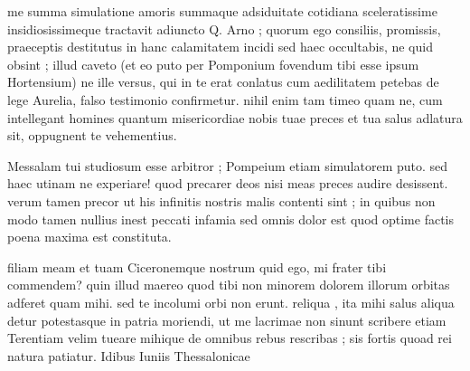  me summa simulatione amoris summaque adsiduitate cotidiana sceleratissime insidiosissimeque tractavit adiuncto Q. Arno ; quorum ego consiliis, promissis, praeceptis destitutus in hanc calamitatem incidi sed haec occultabis, ne quid obsint ; illud caveto (et eo puto per Pomponium fovendum tibi esse ipsum Hortensium) ne ille versus, qui in te erat conlatus cum aedilitatem petebas de lege Aurelia, falso testimonio confirmetur. nihil enim tam timeo quam ne, cum intellegant homines quantum misericordiae nobis tuae preces et tua salus adlatura sit, oppugnent te vehementius.

 Messalam tui studiosum esse arbitror ; Pompeium etiam simulatorem puto. sed haec utinam ne experiare! quod precarer deos nisi meas preces audire desissent. verum tamen precor ut his infinitis nostris malis contenti sint ; in quibus non modo tamen nullius inest peccati infamia sed omnis dolor est quod optime factis poena maxima est constituta.

 filiam meam et tuam Ciceronemque nostrum quid ego, mi frater tibi commendem? quin illud maereo quod tibi non minorem dolorem illorum orbitas adferet quam mihi. sed te incolumi orbi non erunt. reliqua , ita mihi salus aliqua detur potestasque in patria moriendi, ut me lacrimae non sinunt scribere etiam Terentiam velim tueare mihique de omnibus rebus rescribas ; sis fortis quoad rei natura patiatur. Idibus Iuniis Thessalonicae
